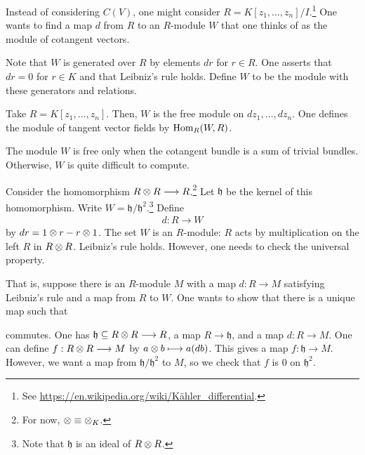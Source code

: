 \documentclass [11 pt, oneside] {article}
\begin{document}
Instead of considering $C(V)$, one might consider $R=K[z_1,\hdots, z_n]/I$.\footnote{See \url{https://en.wikipedia.org/wiki/Kähler_differential}.} One wants to find a map $d$ from $R$ to an $R$-module $W$ that one thinks of as the module of cotangent vectors.

Note that $W$ is generated over $R$ by elements $dr$ for $r\in R$. One asserts that $dr=0$ for $r\in K$ and that Leibniz's rule holds. Define $W$ to be the module with these generators and relations.

\begin{example}[ ]\label{}\text{}
Take $R=K[z_1,\hdots, z_n]$. Then, $W$ is the free module on $dz_1,\hdots, dz_n$. One defines the module of tangent vector fields by $\operatorname{Hom}_{R}(W, R)$.
\end{example}

\begin{remark}
	The module $W$ is free only when the cotangent bundle is a sum of trivial bundles. Otherwise, $W$ is quite difficult to compute.
\end{remark}

Consider the homomorphism $R\otimes R\longrightarrow R$.\footnote{For now, $\otimes\equiv\otimes_K$.} Let $\mathfrak{h}$ be the kernel of this homomorphism. Write $W = \mathfrak{h}/\mathfrak{h}^2$.\footnote{Note that $\mathfrak{h}$ is an ideal of $R\otimes R$.} Define 
\begin{align*}
	d :R\longrightarrow W
\end{align*}
by $dr = 1\otimes r - r\otimes 1$. The set $W$ is an $R$-module: $R$ acts by multiplication on the left $R$ in $R\otimes R$. Leibniz's rule holds. However, one needs to check the universal property.

That is, suppose there is an $R$-module $M$ with a map $d:R\longrightarrow M$ satisfying Leibniz's rule and a map from $R$ to $W$. One wants to show that there is a unique map such that
\begin{center}
\end{center}
commutes. One has $\mathfrak{h}\subseteq R\otimes R\longrightarrow R$, a map $R\longrightarrow \mathfrak{h}$, and a map $d:R\longrightarrow M$. One can define $f:R\otimes R\longrightarrow M$ by $a\otimes b \longmapsto a(db)$. This gives a map $f:\mathfrak{h}\longrightarrow M$. However, we want a map from $\mathfrak{h}/\mathfrak{h}^2$ to $M$, so we check that $f$ is $0$ on $\mathfrak{h}^2$.
\end{document}
